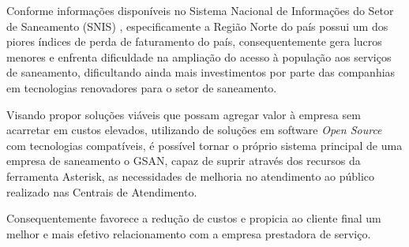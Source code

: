  Conforme informações disponíveis no Sistema Nacional de Informações do Setor de Saneamento (SNIS) \cite{SNIS:2014}, especificamente a Região Norte do país possui um dos piores índices de perda de faturamento do país, consequentemente gera lucros menores e enfrenta dificuldade na ampliação do acesso à população aos serviços de saneamento, dificultando ainda mais investimentos por parte das companhias em tecnologias renovadores para o setor de saneamento.
 
 Visando propor soluções viáveis que possam agregar valor à empresa sem acarretar em custos elevados, utilizando de soluções em software \textit{Open Source} com tecnologias compatíveis, é possível tornar o próprio sistema principal de uma empresa de saneamento o GSAN, capaz de suprir através dos recursos da ferramenta Asterisk, as necessidades de melhoria no atendimento ao público realizado nas Centrais de Atendimento.
 
 Consequentemente favorece a redução de custos e propicia ao cliente final um melhor e mais efetivo relacionamento com a empresa prestadora de serviço.

